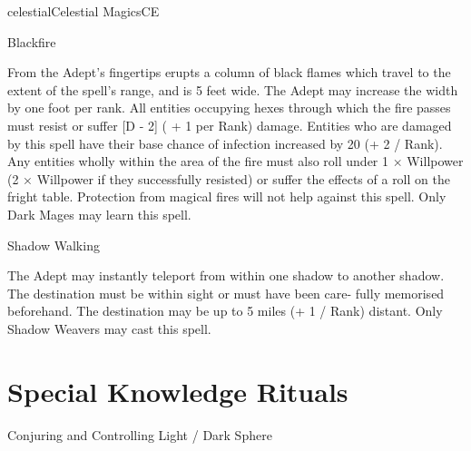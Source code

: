 \begin{College}[1.3]{celestial}{Celestial Magics}{CE}
\begin{spell}[S-10 Dark]{Blackfire}
\begin{effects}
From the Adept’s fingertips erupts a column of black flames which
travel to the extent of the spell’s range, and is 5 feet wide.  The
Adept may increase the width by one foot per rank.  All entities
occupying hexes through which the fire passes must resist or suffer [D
  - 2] ( + 1 per Rank) damage.  Entities who are damaged by this spell
have their base chance of infection increased by 20 (+ 2 / Rank). Any
entities wholly within the area of the fire must also roll under 1 ×
Willpower (2 × Willpower if they successfully resisted) or suffer the
effects of a roll on the fright table.  Protection from magical fires
will not help against this spell.  Only Dark Mages may learn this
spell.
\end{effects}
\end{spell}

\begin{spell}[S-10 Shadow]{Shadow Walking}

\begin{effects}
The Adept may instantly teleport from within one shadow to another
shadow. The destination must be within sight or must have been care-
fully memorised beforehand.  The destination may be up to 5 miles (+ 1
/ Rank) distant. Only Shadow Weavers may cast this spell.
\end{effects}
\end{spell}

\section{Special Knowledge Rituals}

\begin{ritual}[R-1]{Conjuring and Controlling Light / Dark Sphere}


\end{ritual}
\end{College}
